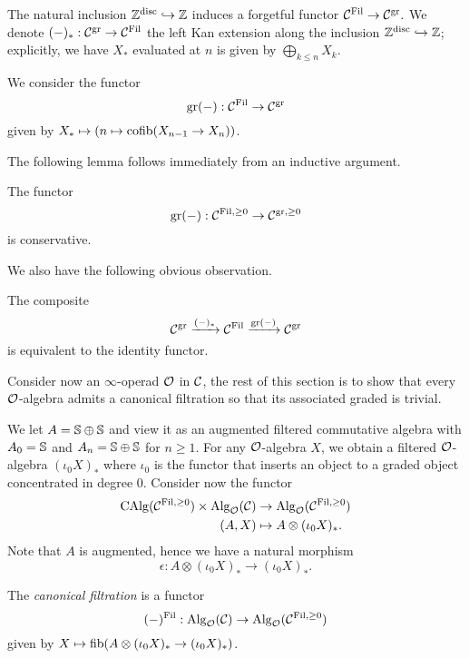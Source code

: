 The natural inclusion $ {\mathbb{Z}}^{\operatorname{disc}}\hookrightarrow {\mathbb{Z}}$ induces a forgetful functor
$
{\mathcal{C}}^{\operatorname{Fil}} \to {\mathcal{C}}^{\operatorname{gr}}. 
$
We denote $(-)_*: {\mathcal{C}}^{\operatorname{gr}} \to {\mathcal{C}}^{\operatorname{Fil}}$ the left Kan extension along the inclusion $ {\mathbb{Z}}^{\operatorname{disc}}\hookrightarrow {\mathbb{Z}}$; explicitly, we have
$X_*$ evaluated at $n$ is given by $\bigoplus_{k\leq n} X_k$.

We consider the functor 
$$
\operatorname{gr}(-):
{\mathcal{C}}^{\operatorname{Fil}}
\to 
{\mathcal{C}}^{\operatorname{gr}}
$$
given by $X_* \mapsto (n \mapsto \operatorname{cofib}(X_{n-1} \to X_{n}))$.

The following lemma follows immediately from an inductive argument.
\begin{lemma}
	The functor $$\operatorname{gr}(-):
{\mathcal{C}}^{\operatorname{Fil, \geq 0}}
\to 
{\mathcal{C}}^{\operatorname{gr, \geq 0}}
$$
is conservative.
\end{lemma}

We also have the following obvious observation.
\begin{lemma}
	The composite 
	\[
	{\mathcal{C}}^{\operatorname{gr}} \xrightarrow{(-)_*} 
	{\mathcal{C}}^{\operatorname{Fil}}
	\xrightarrow{\operatorname{gr}(-)} {\mathcal{C}}^{\operatorname{gr}}
	\]
	is equivalent to the identity functor.
\end{lemma}



Consider now an $\infty$-operad ${\mathcal{O}}$ in ${\mathcal{C}}$, the rest of this section is to show that every ${\mathcal{O}}$-algebra admits a canonical filtration so that its associated graded is trivial.

We let $A = {\mathbb{S}} \oplus {\mathbb{S}}$ and view it as an augmented filtered commutative algebra with $A_0={\mathbb{S}}$ and 
$A_n={\mathbb{S}} \oplus {\mathbb{S}}$ for $n\geq 1$.
For any ${\mathcal{O}}$-algebra $X$, we obtain a filtered ${\mathcal{O}}$-algebra $(\iota_0X)_*$ where $\iota_0$ is the functor that inserts an object to a graded object concentrated in degree $0$.
Consider now the functor
\begin{align*}
	\operatorname{CAlg}({\mathcal{C}}^{\operatorname{Fil}, \geq 0}) \times \operatorname{Alg}_{{\mathcal{O}}}({\mathcal{C}}) 
	& \to 
	\operatorname{Alg}_{{\mathcal{O}}}({\mathcal{C}}^{\operatorname{Fil}, \geq 0})\\
	(A, X) & \mapsto A\otimes (\iota_0X)_*.
\end{align*}
Note that $A$ is augmented, hence we have a natural morphism 
\[
\epsilon: A\otimes (\iota_0X)_* 
\to 
(\iota_0X)_* .
\]

\begin{definition}
	The \emph{canonical filtration} is a functor 
	$$
	(-)^{\operatorname{Fil}}: \operatorname{Alg}_{{\mathcal{O}}}({\mathcal{C}})\to \operatorname{Alg}_{{\mathcal{O}}}({\mathcal{C}}^{\operatorname{Fil},\geq 0})
	$$ 
	given by
	$X\mapsto   \operatorname{fib}(A\otimes (\iota_0X)_* \to (\iota_0X)_*)$.
\end{definition}

